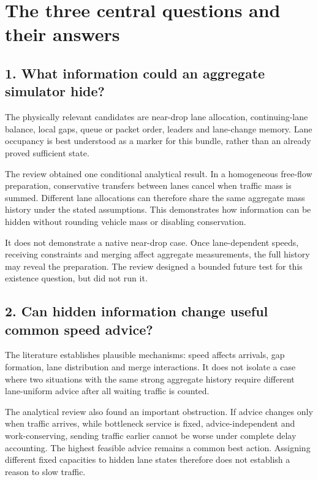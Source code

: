 \documentclass[10pt]{article}
\begin{document}
\section{The three central questions and their answers}

\subsection{1. What information could an aggregate simulator hide?}

The physically relevant candidates are near-drop lane allocation, continuing-lane
balance, local gaps, queue or packet order, leaders and lane-change memory. Lane
occupancy is best understood as a marker for this bundle, rather than an already
proved sufficient state.

The review obtained one conditional analytical result. In a homogeneous
free-flow preparation, conservative transfers between lanes cancel when traffic
mass is summed. Different lane allocations can therefore share the same aggregate
mass history under the stated assumptions. This demonstrates how information can
be hidden without rounding vehicle mass or disabling conservation.

It does not demonstrate a native near-drop case. Once lane-dependent speeds,
receiving constraints and merging affect aggregate measurements, the full history
may reveal the preparation. The review designed a bounded future test for this
existence question, but did not run it.

\subsection{2. Can hidden information change useful common speed advice?}

The literature establishes plausible mechanisms: speed affects arrivals, gap
formation, lane distribution and merge interactions. It does not isolate a case
where two situations with the same strong aggregate history require different
lane-uniform advice after all waiting traffic is counted.

The analytical review also found an important obstruction. If advice changes
only when traffic arrives, while bottleneck service is fixed, advice-independent
and work-conserving, sending traffic earlier cannot be worse under complete delay
accounting. The highest feasible advice remains a common best action. Assigning
different fixed capacities to hidden lane states therefore does not establish a
reason to slow traffic.
\end{document}
